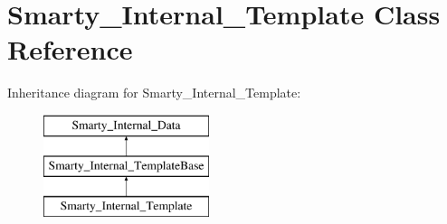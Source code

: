 \hypertarget{class_smarty___internal___template}{}\section{Smarty\+\_\+\+Internal\+\_\+\+Template Class Reference}
\label{class_smarty___internal___template}
Inheritance diagram for Smarty\+\_\+\+Internal\+\_\+\+Template\+:\begin{figure}[H]
\begin{center}
\leavevmode
\includegraphics[height=3.000000cm]{class_smarty___internal___template}
\end{center}
\end{figure}
